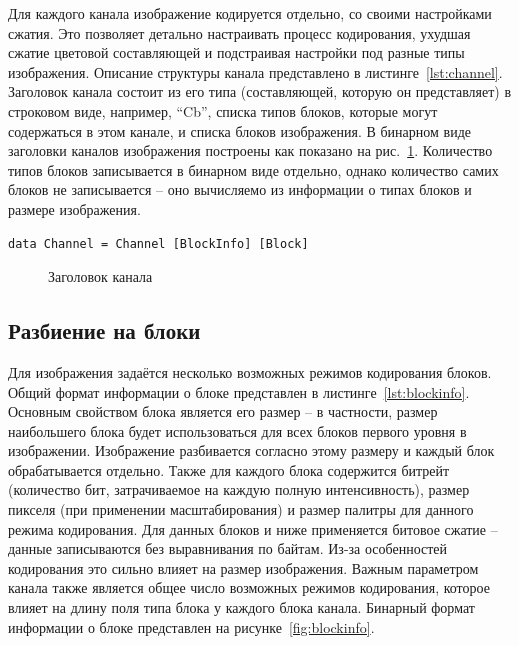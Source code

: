 \documentclass[a4paper,12pt]{article}
\numberwithin{equation}{section}
\begin{document}
Для каждого канала изображение кодируется отдельно, со своими настройками
сжатия. Это позволяет детально настраивать процесс кодирования, ухудшая сжатие
цветовой составляющей и подстраивая настройки под разные типы
изображения. Описание структуры канала представлено в
листинге~\ref{lst:channel}. Заголовок канала состоит из его типа (составляющей,
которую он представляет) в строковом виде, например, ``Cb'', списка типов
блоков, которые могут содержаться в этом канале, и списка блоков изображения.  В
бинарном виде заголовки каналов изображения построены как показано на
рис.~\ref{fig:channel}. Количество типов блоков записывается в бинарном виде
отдельно, однако количество самих блоков не записывается -- оно вычисляемо из
информации о типах блоков и размере изображения.

\begin{lstlisting}[float=t,caption={Структура канала},label=lst:channel]
  data Channel = Channel [BlockInfo] [Block]
\end{lstlisting}

\begin{figure}[t]
  \centering
  
  \caption{Заголовок канала}
  \label{fig:channel}
\end{figure}

\subsection{Разбиение на блоки}

Для изображения задаётся несколько возможных режимов кодирования блоков. Общий
формат информации о блоке представлен в листинге~\ref{lst:blockinfo}. Основным
свойством блока является его размер -- в частности, размер наибольшего блока
будет использоваться для всех блоков первого уровня в изображении. Изображение
разбивается согласно этому размеру и каждый блок обрабатывается отдельно. Также
для каждого блока содержится битрейт (количество бит, затрачиваемое на каждую
полную интенсивность), размер пикселя (при применении масштабирования) и размер
палитры для данного режима кодирования. Для данных блоков и ниже применяется
битовое сжатие -- данные записываются без выравнивания по байтам. Из-за
особенностей кодирования это сильно влияет на размер изображения. Важным
параметром канала также является общее число возможных режимов кодирования,
которое влияет на длину поля типа блока у каждого блока канала. Бинарный формат
информации о блоке представлен на рисунке~\ref{fig:blockinfo}.
\end{document}
